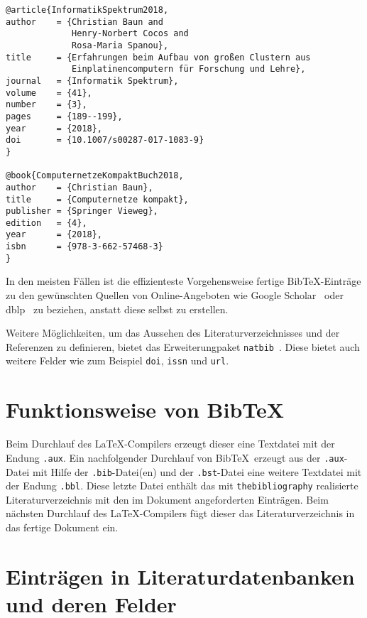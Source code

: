 \begin{lstlisting}[caption={Einige Beispeile für Bib\TeX-Einträge},label=Bibtext_beispiele_listing, style=customlatex]
@article{InformatikSpektrum2018,
author    = {Christian Baun and
             Henry-Norbert Cocos and
             Rosa-Maria Spanou},
title     = {Erfahrungen beim Aufbau von großen Clustern aus
             Einplatinencomputern für Forschung und Lehre},
journal   = {Informatik Spektrum},
volume    = {41},
number    = {3},
pages     = {189--199},
year      = {2018},
doi       = {10.1007/s00287-017-1083-9}
}

@book{ComputernetzeKompaktBuch2018,
author    = {Christian Baun},
title     = {Computernetze kompakt},
publisher = {Springer Vieweg},
edition   = {4},
year      = {2018},
isbn      = {978-3-662-57468-3}
}
\end{lstlisting}


In den meisten Fällen ist die effizienteste Vorgehensweise fertige Bib\TeX-Einträge zu den gewünschten Quellen von Online-Angeboten wie Google Scholar~\cite{GoogleScholarWebseite} oder dblp~\cite{DBLPWebseite} zu beziehen, anstatt diese selbst zu erstellen.

Weitere Möglichkeiten, um das Aussehen des Literaturverzeichnisses und der Referenzen zu definieren, bietet das Erweiterungpaket \verb|natbib|~\cite{natbibDoku}. Diese bietet auch weitere Felder wie zum Beispiel \texttt{doi}, \texttt{issn} und \texttt{url}.

\section{Funktionsweise von Bib\TeX}
\label{Abschnitt_Funktionsweise_Bibtex}

Beim Durchlauf des \LaTeX-Compilers erzeugt dieser eine Textdatei mit der Endung \verb|.aux|. Ein nachfolgender Durchlauf von Bib\TeX\ erzeugt aus der \verb|.aux|-Datei mit Hilfe der \verb|.bib|-Datei(en) und der \verb|.bst|-Datei eine weitere Textdatei mit der Endung \verb|.bbl|. Diese letzte Datei enthält das mit \verb|thebibliography| realisierte Literaturverzeichnis mit den im Dokument angeforderten Einträgen. Beim nächsten Durchlauf des \LaTeX-Compilers fügt dieser das Literaturverzeichnis in das fertige Dokument ein.

\section{Einträgen in Literaturdatenbanken und deren Felder}
\label{Abschnitt_Eintraege_Bibtex_Felder}

